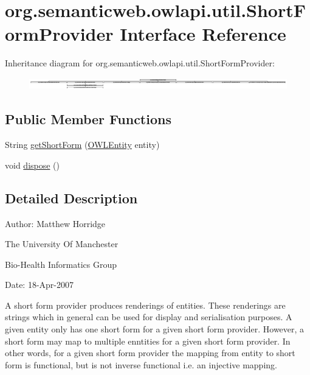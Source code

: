 \hypertarget{interfaceorg_1_1semanticweb_1_1owlapi_1_1util_1_1_short_form_provider}{\section{org.\-semanticweb.\-owlapi.\-util.\-Short\-Form\-Provider Interface Reference}
\label{interfaceorg_1_1semanticweb_1_1owlapi_1_1util_1_1_short_form_provider}
}
Inheritance diagram for org.\-semanticweb.\-owlapi.\-util.\-Short\-Form\-Provider\-:\begin{figure}[H]
\begin{center}
\leavevmode
\includegraphics[height=0.513644cm]{interfaceorg_1_1semanticweb_1_1owlapi_1_1util_1_1_short_form_provider}
\end{center}
\end{figure}
\subsection*{Public Member Functions}
\begin{DoxyCompactItemize}
\item 
String \hyperlink{interfaceorg_1_1semanticweb_1_1owlapi_1_1util_1_1_short_form_provider_aca40ef0eda3bf146115c473088cc305d}{get\-Short\-Form} (\hyperlink{interfaceorg_1_1semanticweb_1_1owlapi_1_1model_1_1_o_w_l_entity}{O\-W\-L\-Entity} entity)
\item 
void \hyperlink{interfaceorg_1_1semanticweb_1_1owlapi_1_1util_1_1_short_form_provider_ad6c6020e37b03e441f686826c5cf3d11}{dispose} ()
\end{DoxyCompactItemize}


\subsection{Detailed Description}
Author\-: Matthew Horridge\par
 The University Of Manchester\par
 Bio-\/\-Health Informatics Group\par
 Date\-: 18-\/\-Apr-\/2007\par
\par
 A short form provider produces renderings of entities. These renderings are strings which in general can be used for display and serialisation purposes. A given entity only has one short form for a given short form provider. However, a short form may map to multiple enntities for a given short form provider. In other words, for a given short form provider the mapping from entity to short form is functional, but is not inverse functional i.\-e. an injective mapping. 

